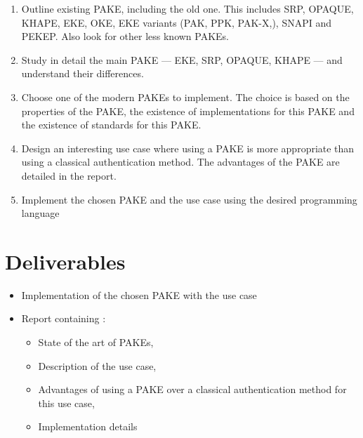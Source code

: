 ﻿\documentclass[../report.tex]{subfiles}
\begin{document}
\begin{enumerate}
 \item Outline existing PAKE, including the old one. This includes SRP, OPAQUE, KHAPE, EKE, OKE, EKE variants (PAK, PPK, PAK-X,), SNAPI and PEKEP. Also look for other less known PAKEs.
 \item Study in detail the main PAKE --- EKE, SRP, OPAQUE, KHAPE --- and understand their differences.
 \item Choose one of the modern PAKEs to implement. The choice is based on the properties of the PAKE, the existence of implementations for this PAKE and the existence of standards for this PAKE.
 \item Design an interesting use case where using a PAKE is more appropriate than using a classical authentication method. The advantages of the PAKE are detailed in the report.
 \item Implement the chosen PAKE and the use case using the desired programming language
\end{enumerate}



\section*{Deliverables}
\begin{itemize}
 \item Implementation of the chosen PAKE with the use case
 \item Report containing :
 \begin{itemize}
    \item State of the art of PAKEs,
    \item Description of the use case,
    \item Advantages of using a PAKE over a classical authentication method for this use case,
    \item Implementation details
 \end{itemize}
\end{itemize}
\end{document}
